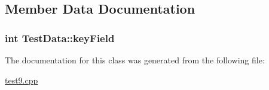 \subsection{\-Member \-Data \-Documentation}
\hypertarget{class_test_data_adafb60a315eaa088791c9e40f4a2618f}{
\subsubsection[{key\-Field}]{\setlength{\rightskip}{0pt plus 5cm}int {\bf \-Test\-Data\-::key\-Field}}}\label{class_test_data_adafb60a315eaa088791c9e40f4a2618f}


\-The documentation for this class was generated from the following file\-:\begin{DoxyCompactItemize}
\item 
\hyperlink{test9_8cpp}{test9.\-cpp}\end{DoxyCompactItemize}
